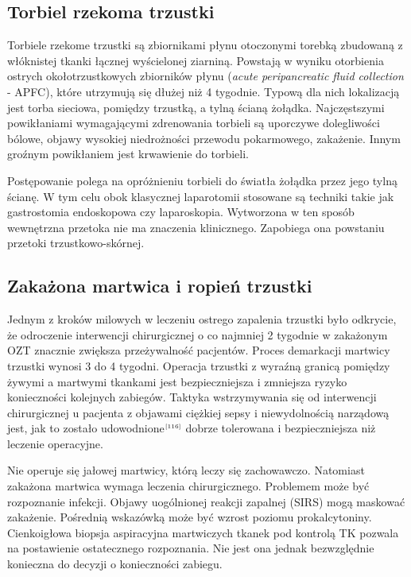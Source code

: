 \documentclass[a4paper, 12pt]{report}
\newcommand\cyt[1]{$^{\tiny{\cite{#1}}}$}
\begin{document}
\subsection*{Torbiel rzekoma trzustki}

Torbiele rzekome trzustki są zbiornikami płynu otoczonymi torebką
zbudowaną z włóknistej tkanki łącznej wyścielonej ziarniną. Powstają w
wyniku otorbienia ostrych okołotrzustkowych zbiorników płynu
(\textsl{acute peripancreatic fluid collection} - APFC), które
utrzymują się dłużej niż 4 tygodnie. Typową dla nich lokalizacją jest
torba sieciowa, pomiędzy trzustką, a tylną ścianą
żołądka. Najczęstszymi powikłaniami wymagającymi zdrenowania torbieli
są uporczywe dolegliwości bólowe, objawy wysokiej niedrożności
przewodu pokarmowego, zakażenie. Innym groźnym powikłaniem jest
krwawienie do torbieli.

Postępowanie polega na opróżnieniu torbieli do światła żołądka przez
jego tylną ścianę. W tym celu obok klasycznej laparotomii stosowane są
techniki takie jak gastrostomia endoskopowa czy
laparoskopia. Wytworzona w ten sposób wewnętrzna przetoka nie ma
znaczenia klinicznego. Zapobiega ona powstaniu przetoki
trzustkowo-skórnej.

\subsection*{Zakażona martwica i ropień trzustki}

Jednym z kroków milowych w leczeniu ostrego zapalenia trzustki było
odkrycie, że odroczenie interwencji chirurgicznej o co najmniej 2
tygodnie w zakażonym OZT znacznie zwiększa przeżywalność
pacjentów. Proces demarkacji martwicy trzustki wynosi 3 do 4
tygodni. Operacja trzustki z wyraźną granicą pomiędzy żywymi a
martwymi tkankami jest bezpieczniejsza i zmniejsza ryzyko konieczności
kolejnych zabiegów. Taktyka wstrzymywania się od interwencji
chirurgicznej u pacjenta z objawami ciężkiej sepsy i niewydolnością
narządową jest, jak to zostało udowodnione\cyt{116} dobrze tolerowana
i bezpieczniejsza niż leczenie operacyjne.

Nie operuje się jałowej martwicy, którą leczy się
zachowawczo. Natomiast zakażona martwica wymaga leczenia
chirurgicznego. Problemem może być rozpoznanie infekcji. Objawy
uogólnionej reakcji zapalnej (SIRS) mogą maskować zakażenie. Pośrednią
wskazówką może być wzrost poziomu prokalcytoniny. Cienkoigłowa
biopsja aspiracyjna martwiczych tkanek pod kontrolą TK pozwala na
postawienie ostatecznego rozpoznania. Nie jest ona jednak bezwzględnie
konieczna do decyzji o konieczności zabiegu.
\end{document}
